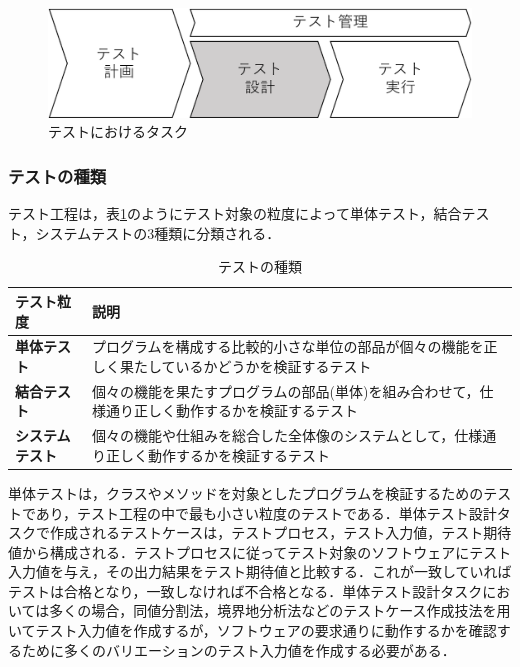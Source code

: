 \documentclass[12pt]{jarticle} %
\begin{document}
\begin{figure}[htbp]
  \begin{center}
    \includegraphics[clip,width=12cm]{test-task.pdf}
    \caption{テストにおけるタスク}
    \label{testtask}
  \end{center}
\end{figure}

\subsubsection{テストの種類}

テスト工程は，表\ref{test-variety}のようにテスト対象の粒度によって単体テスト，結合テスト，システムテストの3種類に分類される．

\begin{table}[t]
\caption{テストの種類}
\label{test-variety}
\begin{tabular}{|l|p{11cm}|}
\hline
\textbf{テスト粒度}                   & \textbf{説明}                                                                                                       \\ \hline
\textbf{単体テスト}        & プログラムを構成する比較的小さな単位の部品が個々の機能を正しく果たしているかどうかを検証するテスト \\ \hline
\textbf{結合テスト} & 個々の機能を果たすプログラムの部品(単体)を組み合わせて，仕様通り正しく動作するかを検証するテスト\\ \hline
\textbf{システムテスト}            & 個々の機能や仕組みを総合した全体像のシステムとして，仕様通り正しく動作するかを検証するテスト \\ \hline
\end{tabular}
\end{table}

単体テストは，クラスやメソッドを対象としたプログラムを検証するためのテストであり，テスト工程の中で最も小さい粒度のテストである．単体テスト設計タスクで作成されるテストケースは，テストプロセス，テスト入力値，テスト期待値から構成される．テストプロセスに従ってテスト対象のソフトウェアにテスト入力値を与え，その出力結果をテスト期待値と比較する．これが一致していればテストは合格となり，一致しなければ不合格となる．単体テスト設計タスクにおいては多くの場合，同値分割法，境界地分析法などのテストケース作成技法を用いてテスト入力値を作成するが，ソフトウェアの要求通りに動作するかを確認するために多くのバリエーションのテスト入力値を作成する必要がある．
\end{document}
